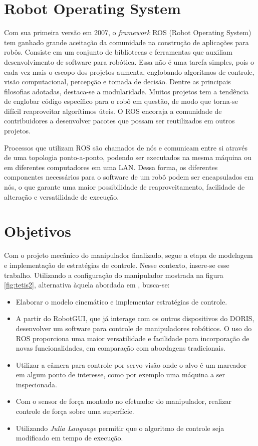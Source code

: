 \section{Robot Operating System}
Com sua primeira versão em 2007, o \textit{framework} ROS (Robot Operating System) tem ganhado grande aceitação da comunidade na construção de aplicações para robôs. Consiste em um conjunto de bibliotecas e ferramentas que auxiliam desenvolvimento de software para robótica. Essa não é uma tarefa simples, pois o cada vez mais o escopo dos projetos aumenta, englobando algoritmos de controle, visão computacional, percepção e tomada de decisão.
Dentre as principais filosofias adotadas, destaca-se a modularidade. 
Muitos projetos tem a tendência de englobar código específico para o robô em questão, de modo que torna-se difícil reaproveitar algorítimos úteis. O ROS encoraja a comunidade de contribuidores a desenvolver pacotes que possam ser reutilizados em outros projetos.  

Processos que utilizam ROS são chamados de nós e comunicam entre si através de uma topologia ponto-a-ponto, podendo ser executados na mesma máquina ou em diferentes computadores em uma LAN. Dessa forma, os diferentes componentes necessários para o software de um robô podem ser encapsulados em nós, o que garante uma maior possibilidade de reaproveitamento, facilidade de alteração e versatilidade de execução.


\section{Objetivos}

Com o projeto mecânico do manipulador finalizado, segue a etapa de modelagem e implementação de estratégias de controle. 
Nesse contexto, insere-se esse trabalho. Utilizando a configuração do manipulador mostrada na figura \ref{fig:tetis2}, alternativa àquela abordada em \citep{xaud2016doris},  busca-se:
\begin{itemize}
\item Elaborar o modelo cinemático e implementar estratégias de controle. %

\item A partir do RobotGUI, que já interage com os outros dispositivos do DORIS, desenvolver um software para controle de manipuladores robóticos. O uso do ROS proporciona uma maior versatilidade e facilidade para incorporação de novas funcionalidades, em comparação com abordagens tradicionais.

\item Utilizar a câmera para controle por servo visão onde o alvo é um marcador em algum ponto de interesse, como por exemplo uma máquina a ser inspecionada. 

\item Com o sensor de força montado no efetuador do manipulador, realizar controle de força sobre uma superfície.

\item Utilizando \textit{Julia Language} permitir que o algoritmo de controle seja modificado em tempo de execução.
\end{itemize}



